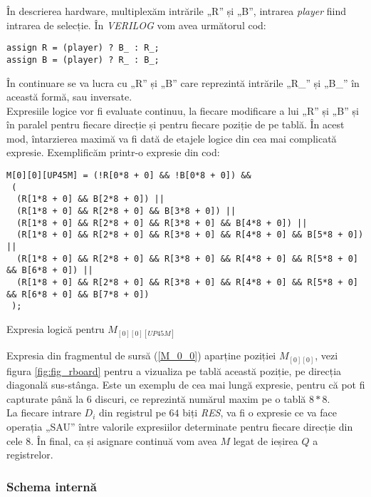 \documentclass[12pt,twoside,a4paper,fleqn]{book}
\theoremstyle{definition}
\begin{document}
În descrierea hardware, multiplexăm intrările „R” și „B”, intrarea \emph{player} fiind intrarea de selecție.
În \emph{VERILOG} vom avea următorul cod:
\begin{verbatim}
assign R = (player) ? B_ : R_;
assign B = (player) ? R_ : B_;
\end{verbatim}
În continuare se va lucra cu „R” și „B” care reprezintă intrările „R\_” și „B\_” în această formă, sau inversate.\\
Expresiile logice vor fi evaluate continuu, la fiecare modificare a lui „R” și „B” și în paralel pentru fiecare direcție și pentru fiecare poziție de pe tablă. În acest mod, întarzierea maximă va fi dată de etajele logice din cea mai complicată expresie.
Exemplificăm printr-o expresie din cod:


\begin{fragmentsursa}
\begin{scriptsize}
  \begin{verbatim}
M[0][0][UP45M] = (!R[0*8 + 0] && !B[0*8 + 0]) && 
 (
  (R[1*8 + 0] && B[2*8 + 0]) ||
  (R[1*8 + 0] && R[2*8 + 0] && B[3*8 + 0]) ||
  (R[1*8 + 0] && R[2*8 + 0] && R[3*8 + 0] && B[4*8 + 0]) ||
  (R[1*8 + 0] && R[2*8 + 0] && R[3*8 + 0] && R[4*8 + 0] && B[5*8 + 0]) ||
  (R[1*8 + 0] && R[2*8 + 0] && R[3*8 + 0] && R[4*8 + 0] && R[5*8 + 0] && B[6*8 + 0]) ||
  (R[1*8 + 0] && R[2*8 + 0] && R[3*8 + 0] && R[4*8 + 0] && R[5*8 + 0] && R[6*8 + 0] && B[7*8 + 0]) 
 );
  \end{verbatim}
\end{scriptsize}  
\caption{Expresia logică pentru $M_{[0][0][UP45M]}$}
\label{M_0_0}
\end{fragmentsursa}


Expresia din fragmentul de sursă (\ref{M_0_0}) aparține poziției $M_{[0][0]}$, vezi figura \ref{fig:fig_rboard} pentru a vizualiza pe tablă această poziție, pe direcția diagonală sus-stânga. Este un exemplu de cea mai lungă expresie, pentru că pot fi capturate până la $6$ discuri, ce reprezintă numărul maxim pe o tablă $8*8$.\\
La fiecare intrare $D_{i}$ din registrul pe $64$ biți \emph{RES}, va fi o expresie ce va face operația „SAU” între valorile expresiilor determinate pentru fiecare direcție din cele $8$. În final, ca și asignare continuă vom avea $M$ legat de ieșirea $Q$ a registrelor.

\subsubsection{Schema internă}
\end{document}
